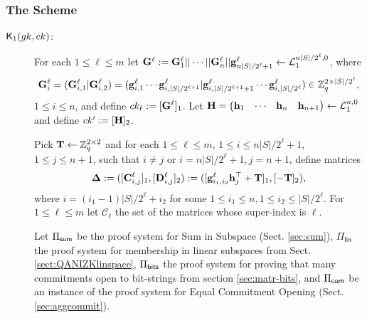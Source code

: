 \subsubsection{The Scheme}

\begin{description}

\item[{$\mathsf{K}_1({gk}, ck)$}:]
For each $1\leq \ell\leq m$ let $\mathbf{{G}}^\ell:=\mathbf{{G}}^\ell_1||\cdots||\mathbf{{G}}^\ell_n||\mathbf{g}^\ell_{n|S|/2^\ell+1}\gets\mathcal{L}_1^{n|S|/2^\ell,0}$, where
$$\mathbf{{G}}^\ell_i=
(\mathbf{{G}}^\ell_{i,1}|\mathbf{{G}}^\ell_{i,2})
=
(\mathbf{g}^\ell_{i,1}\cdots\mathbf{g}^\ell_{i,|S|/2^{\ell+1}}|\mathbf{g}^\ell_{i,|S|/2^{\ell+1}+1}\cdots\mathbf{g}^\ell_{i,|S|/2^\ell})
\in\mathbb{Z}_q^{2\times|S|/2^\ell},$$ $1\leq i\leq n$, and define $ck_\ell:=[\mathbf{{G}}^\ell]_1$.
Let $\mathbf{{H}}=\begin{pmatrix}\mathbf{h}_1&\cdots&\mathbf{h}_n&\mathbf{h}_{n+1}\end{pmatrix}\gets\mathcal{L}_1^{n,0}$ and define $ck':=[\mathbf{{H}}]_2$. 

Pick $\mathbf{{T}}\gets\mathbb{Z}_q^{2\times 2}$ and for each $1\leq \ell\leq m$, $1\leq i \leq n|S|/2^\ell+1$, $1\leq j\leq n+1$, such that $i\neq j$ or $i=n|S|/2^\ell+1,j=n+1$, define matrices
$$\mathbf{{\Delta}}:=([\mathbf{{C}}_{i,j}^\ell]_1,[\mathbf{{D}}_{i,j}^\ell]_2):=([\mathbf{g}_{i_1,i_2}^\ell\mathbf{h}_j^{\top}+\mathbf{{T}}]_1,[-\mathbf{{T}}]_2),$$
where $i=(i_1-1)|S|/2^\ell+i_2$ for some $1\leq i_1\leq n,1\leq i_2 \leq |S|/2^\ell$. For $1\leq \ell\leq m$ let $\mathcal{C}_\ell$ the set of the matrices whose super-index is $\ell$.


Let $\Pi_{\mathsf{sum}}$ be the proof system for Sum in Subspace 
(Sect. \ref{sec:sum}), $\Pi_\mathsf{lin}$ the proof system for membership in linear subspaces from Sect. \ref{sect:QANIZKlinspace}, $\Pi_{\mathsf{bits}}$ the proof system for proving that many commitments open to bit-strings from section \ref{sec:matr-bits}, and $\Pi_{\mathsf{com}}$
be an instance of the proof system for Equal Commitment Opening (Sect. \ref{sec:aggcommit}).


\end{description}
